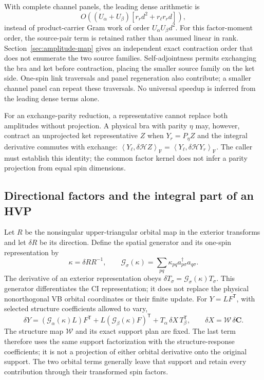\documentclass[11pt,a4paper]{article}
\newcommand{\Tr}{^{\mathsf T}}
\newcommand{\ip}[2]{\left\langle #1,#2\right\rangle_{\mathrm F}}
\newcommand{\Wa}{\mathcal W}
\newcommand{\Ha}{\mathcal H}
\renewcommand{\vv}[1]{\mathbf{#1}}
\begin{document}
With complete channel panels, the leading dense arithmetic is
\begin{equation}
 O\left((U_\alpha+U_\beta)
    [r_r d^2+r_\ell r_r d]\right),
\end{equation}
instead of product-carrier Gram work of order $U_\alpha U_\beta d^2$.
For this factor-moment order, the source-pair term is retained rather than
assumed linear in rank. Section~\ref{sec:amplitude-map} gives an independent
exact contraction order that does not enumerate the two source families.
Self-adjointness permits exchanging the bra and ket before contraction,
placing the smaller source family on the ket side. One-spin link
traversals and panel regeneration also contribute; a smaller channel
panel can repeat these traversals. No universal speedup is inferred from
the leading dense terms alone.

For an exchange-parity reduction, a representative cannot replace both
amplitudes without projection. A physical bra with parity $\eta$ may,
however, contract an unprojected ket representative $Z$ when
$Y_r=P_\eta Z$ and the integral derivative commutes with exchange:
$\ip{Y_\ell}{\delta\Ha Z}=\ip{Y_\ell}{\delta\Ha Y_r}$.
The caller must establish this identity; the common factor kernel does
not infer a parity projection from equal spin dimensions.

\subsection{Directional factors and the integral part of an HVP}

Let $R$ be the nonsingular upper-triangular orbital map in the exterior
transforms and let $\delta R$ be its direction. Define the spatial generator
and its one-spin representation by
\begin{equation}
 \kappa=\delta R R^{-1},\qquad
 \mathcal G_\sigma(\kappa)=\sum_{pq}\kappa_{pq}
       a^\dagger_{p\sigma}a_{q\sigma}.
\end{equation}
The derivative of an exterior representation obeys
$\delta T_\sigma=\mathcal G_\sigma(\kappa)T_\sigma$.
This generator differentiates the CI representation; it does not replace
the physical nonorthogonal VB orbital coordinates or their finite update.
For $Y=LF\Tr$, with selected structure coefficients allowed to vary,
\begin{equation}\label{eq:factor-tangent}
 \boxed{\quad\delta Y=
   (\mathcal G_\alpha(\kappa)L)F\Tr
   +L(\mathcal G_\beta(\kappa)F)\Tr
   +T_\alpha\,\delta X\,T_\beta\Tr,\qquad
   \delta X=\Wa\,\delta\vv C.\quad}
\end{equation}
The structure map $\Wa$ and its exact support plan are fixed. The last term
therefore uses the same support factorization with the structure-response
coefficients; it is not a projection of either orbital derivative onto the
original support. The two orbital terms generally leave that support and
retain every contribution through their transformed spin factors.
\end{document}
